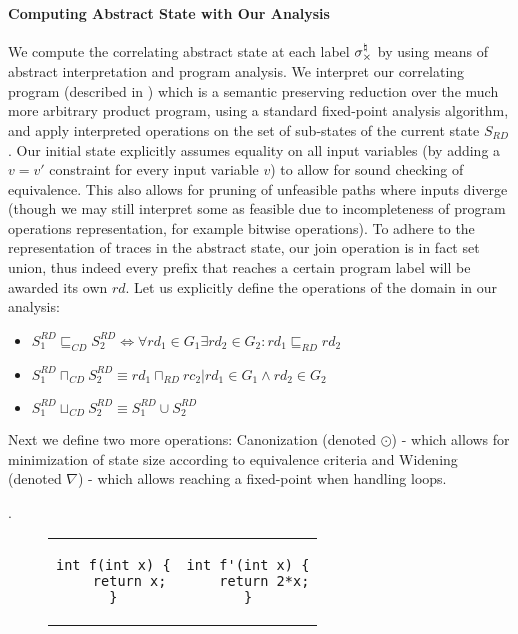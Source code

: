 \paragraph{Computing Abstract State with Our Analysis} 
We compute the correlating abstract state at each label $\sigma_{\times}^\natural$ by using means of abstract interpretation and program analysis. We interpret our correlating program (described in ) which is a semantic preserving reduction over the much more arbitrary product program, using a standard fixed-point analysis algorithm, and apply interpreted operations on the set of sub-states of the current state $S_{RD}$. Our initial state explicitly assumes equality on all input variables (by adding a $v=v'$ constraint for every input variable $v$) to allow for sound checking of equivalence. This also allows for pruning of unfeasible paths where inputs diverge (though we may still interpret some as feasible due to incompleteness of program operations representation, for example bitwise operations). To adhere to the representation of traces in the abstract state, our join operation is in fact set union, thus indeed every prefix that reaches a certain program label will be awarded its own $rd$. Let us explicitly define the operations of the domain in our analysis:
\begin{itemize}
\item $S^{RD}_1 \sqsubseteq_{CD} S^{RD}_2 \Longleftrightarrow \forall rd_1 \in G_1 \exists rd_2 \in G_2 : rd_1 \sqsubseteq_{RD} rd_2$
\item $S^{RD}_1 \sqcap_{CD} S^{RD}_2 \equiv { rd_1 \sqcap_{RD} rc_2 | rd_1 \in G_1 \wedge rd_2 \in G_2}$
\item $S^{RD}_1 \sqcup_{CD} S^{RD}_2 \equiv S^{RD}_1 \cup S^{RD}_2$
\end{itemize}
Next we define two more operations: Canonization (denoted $\odot$) - which allows for minimization of state size according to equivalence criteria and Widening (denoted $\nabla$) - which allows reaching a fixed-point when handling loops.

.

\begin{figure}
\begin{tabular}{cc}
\centering
\begin{lstlisting}
int f(int x) {
    return x;
}
\end{lstlisting}
&
\begin{lstlisting}
int f'(int x) {
    return 2*x;
}
\end{lstlisting}
\end{tabular}
\end{figure}

